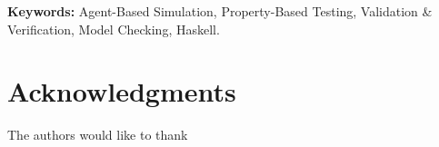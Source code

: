 \documentclass{scspaperproc}
\begin{document}
\textbf{Keywords:} Agent-Based Simulation, Property-Based Testing, Validation \& Verification, Model Checking, Haskell.

\maketitle



















\section*{Acknowledgments}
The authors would like to thank




\end{document}
